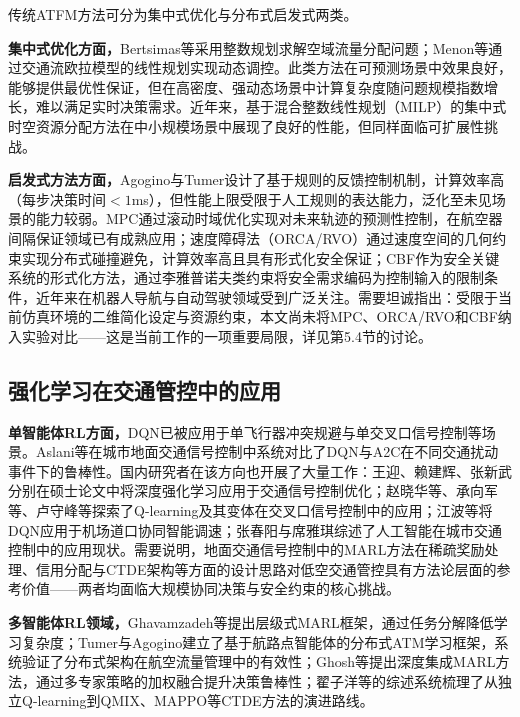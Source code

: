 \documentclass[12pt,a4paper,UTF8]{ctexart}
\begin{document}
传统ATFM方法可分为集中式优化与分布式启发式两类。

\textbf{集中式优化方面，}Bertsimas等采用整数规划求解空域流量分配问题；Menon等通过交通流欧拉模型的线性规划实现动态调控\cite{ref31}。此类方法在可预测场景中效果良好，能够提供最优性保证，但在高密度、强动态场景中计算复杂度随问题规模指数增长，难以满足实时决策需求。近年来，基于混合整数线性规划（MILP）的集中式时空资源分配方法在中小规模场景中展现了良好的性能，但同样面临可扩展性挑战。

\textbf{启发式方法方面，}Agogino与Tumer设计了基于规则的反馈控制机制\cite{ref4}，计算效率高（每步决策时间$<1$ms），但性能上限受限于人工规则的表达能力，泛化至未见场景的能力较弱。MPC\cite{ref27}通过滚动时域优化实现对未来轨迹的预测性控制，在航空器间隔保证领域已有成熟应用；速度障碍法（ORCA/RVO）\cite{ref22}通过速度空间的几何约束实现分布式碰撞避免，计算效率高且具有形式化安全保证；CBF\cite{ref23}作为安全关键系统的形式化方法，通过李雅普诺夫类约束将安全需求编码为控制输入的限制条件，近年来在机器人导航与自动驾驶领域受到广泛关注。需要坦诚指出：受限于当前仿真环境的二维简化设定与资源约束，本文尚未将MPC、ORCA/RVO和CBF纳入实验对比——这是当前工作的一项重要局限，详见第5.4节的讨论。

\subsection{强化学习在交通管控中的应用}

\textbf{单智能体RL方面，}DQN已被应用于单飞行器冲突规避与单交叉口信号控制等场景。Aslani等在城市地面交通信号控制中系统对比了DQN与A2C在不同交通扰动事件下的鲁棒性\cite{ref10}。国内研究者在该方向也开展了大量工作：王迎\cite{ref13}、赖建辉\cite{ref16}、张新武\cite{ref17}分别在硕士论文中将深度强化学习应用于交通信号控制优化；赵晓华等\cite{ref14}、承向军等\cite{ref15}、卢守峰等\cite{ref18}探索了Q-learning及其变体在交叉口信号控制中的应用；江波等将DQN应用于机场道口协同智能调速\cite{ref19}；张春阳与席雅琪综述了人工智能在城市交通控制中的应用现状\cite{ref8}。需要说明，地面交通信号控制中的MARL方法在稀疏奖励处理、信用分配与CTDE架构等方面的设计思路对低空交通管控具有方法论层面的参考价值——两者均面临大规模协同决策与安全约束的核心挑战。

\textbf{多智能体RL领域，}Ghavamzadeh等提出层级式MARL框架，通过任务分解降低学习复杂度\cite{ref12}；Tumer与Agogino建立了基于航路点智能体的分布式ATM学习框架\cite{ref2,ref4,ref5}，系统验证了分布式架构在航空流量管理中的有效性；Ghosh等提出深度集成MARL方法，通过多专家策略的加权融合提升决策鲁棒性\cite{ref9}；翟子洋等的综述系统梳理了从独立Q-learning到QMIX、MAPPO等CTDE方法的演进路线\cite{ref11}。
\end{document}
